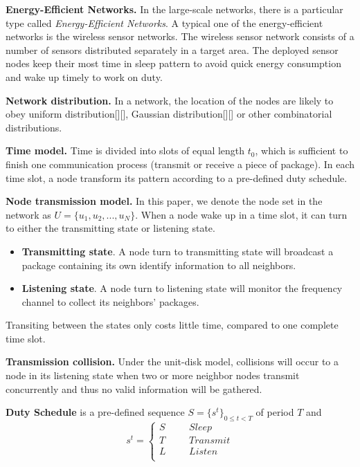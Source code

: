 \textbf{Energy-Efficient Networks.} In the large-scale networks, 
there is a particular type called \emph{Energy-Efficient Networks}.
A typical one of the energy-efficient networks is the wireless sensor networks.
The wireless sensor network consists of a number of sensors distributed separately in a target area.
The deployed sensor nodes keep their most time in sleep pattern to avoid quick energy consumption 
and wake up timely to work on duty.

\textbf{Network distribution.} In a network, the location of the nodes are likely to obey uniform distribution[][],
Gaussian distribution[][] or other combinatorial distributions.

\textbf{Time model.} Time is divided into slots of equal length $t_0$, 
which is sufficient to finish  one communication process
(transmit or receive a piece of package). In each time slot, 
a node transform its pattern according to a pre-defined duty schedule.

\textbf{Node transmission model.} In this paper, we denote the node set in the network as $U = \{u_1,u_2,...,u_N\}$.
When a node wake up in a time slot, it can turn to either the transmitting state or listening state. 
\begin{itemize}
\item \textbf{Transmitting state}. A node turn to transmitting state will broadcast a package containing its own identify 
information to all neighbors.
\item  \textbf{Listening state}. A node turn to listening state will monitor the frequency channel to collect its neighbors' packages.
\end{itemize}
Transiting between the states only costs little time, compared to one complete time slot.

\textbf{Transmission collision.} Under the unit-disk model, collisions will occur 
to a node in its listening state when two or more neighbor nodes 
transmit concurrently and thus no valid information will be gathered.

\begin{definition}
\textbf{Duty Schedule} is a pre-defined sequence $S=\{s^t\}_{0\leq t<T}$ of period $T$ and
$$ s^t=\left\{
\begin{aligned}
S  & & & {Sleep}\\
T  & & & {Transmit}\\
L  & & & {Listen}\\
\end{aligned}
\right.
$$
\end{definition}

